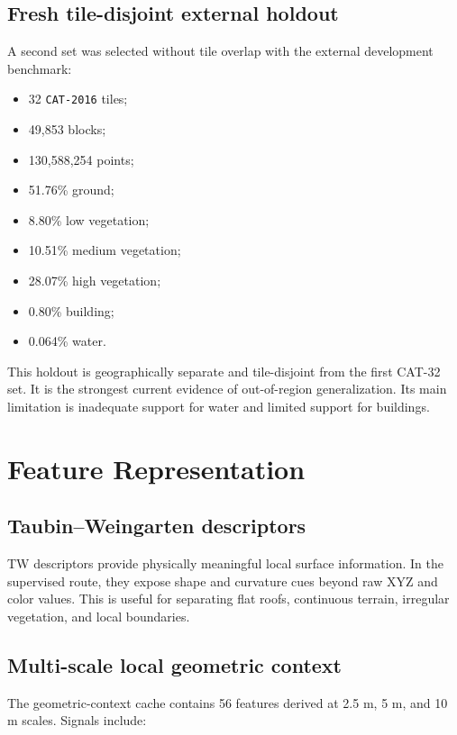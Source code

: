\documentclass[11pt,a4paper]{article}
\begin{document}
\subsection{Fresh tile-disjoint external holdout}

A second set was selected without tile overlap with the external development benchmark:

\begin{itemize}
  \item 32 \texttt{CAT-2016} tiles;
  \item 49,853 blocks;
  \item 130,588,254 points;
  \item 51.76\% ground;
  \item 8.80\% low vegetation;
  \item 10.51\% medium vegetation;
  \item 28.07\% high vegetation;
  \item 0.80\% building;
  \item 0.064\% water.
\end{itemize}

This holdout is geographically separate and tile-disjoint from the first CAT-32 set. It is the strongest current evidence of out-of-region generalization. Its main limitation is inadequate support for water and limited support for buildings.

\section{Feature Representation}

\subsection{Taubin--Weingarten descriptors}

TW descriptors provide physically meaningful local surface information. In the supervised route, they expose shape and curvature cues beyond raw XYZ and color values. This is useful for separating flat roofs, continuous terrain, irregular vegetation, and local boundaries.

\subsection{Multi-scale local geometric context}

The geometric-context cache contains 56 features derived at 2.5 m, 5 m, and 10 m scales. Signals include:
\end{document}
